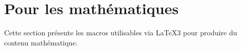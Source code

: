 \documentclass[12pt,a4paper]{article}
\begin{document}
\section{Pour les mathématiques}

Cette section présente les macros utilisables via \LaTeX3 pour produire du contenu mathématique.
\end{document}
